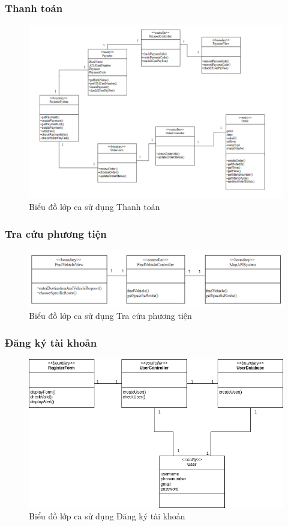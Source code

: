 \subsubsection{Thanh toán}
\begin{figure}[H]
    \centering
    \includegraphics[width=\textwidth]{img2.2/2.2thanhtoan.png}
    \caption{Biểu đồ lớp ca sử dụng Thanh toán}
\end{figure}

\subsubsection{Tra cứu phương tiện}
\begin{figure}[H]
    \centering
    \includegraphics[width=\textwidth]{img2.2/2.2timphuongtien.png}
    \caption{Biểu đồ lớp ca sử dụng Tra cứu phương tiện}
\end{figure}

\subsubsection{Đăng ký tài khoản}
\begin{figure}[H]
    \centering
    \includegraphics[width=\textwidth]{img2.2/Analysis-Đăng ký.drawio.png}
    \caption{Biểu đồ lớp ca sử dụng Đăng ký tài khoản}
\end{figure}

